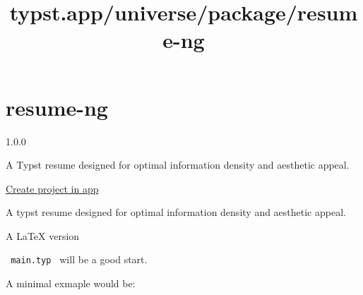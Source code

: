 \title{typst.app/universe/package/resume-ng}

\label{banner}
\label{template-thumbnail}

\section{resume-ng}\label{resume-ng}

{ 1.0.0 }

A Typst resume designed for optimal information density and aesthetic
appeal.

\href{/app?template=resume-ng&version=1.0.0}{Create project in app}

\label{readme}
A typst resume designed for optimal information density and aesthetic
appeal.

A LaTeX version

\texttt{\ main.typ\ } will be a good start.

A minimal exmaple would be:

